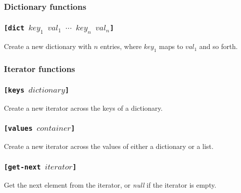 \documentclass[11pt]{report}
\begin{document}
\subsubsection{Dictionary functions}
\subsubsection*{\tt{[dict }$key_1$  $val_1$ $\cdots$ $key_n$ $val_n$\tt{]}}
Create a new dictionary with $n$ entries, where $key_1$ maps to $val_1$ and so forth.

\subsubsection{Iterator functions}
\subsubsection*{\tt{[keys }$dictionary$\tt{]}}
Create a new iterator across the keys of a dictionary.
\subsubsection*{\tt{[values }$container$\tt{]}}
Create a new iterator across the values of either a dictionary or a list.
\subsubsection*{\tt{[get-next }$iterator$\tt{]}}
Get the next element from the iterator, or \emph{null} if the iterator is empty.
\end{document}
